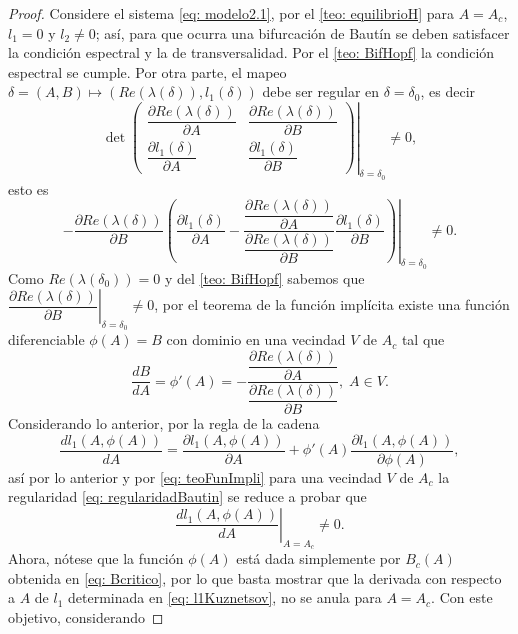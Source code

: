 \documentclass[]{article}
\theoremstyle{remark}
\begin{document}
	\begin{proof}
		Considere el sistema \eqref{eq: modelo2.1}, por el \autoref{teo: equilibrioH} para $A = A_c$, $l_1 = 0$ y $l_2 \neq 0$; así, para que ocurra una bifurcación de Bautín se deben satisfacer la condición espectral y la de transversalidad. Por el \autoref{teo: BifHopf} la condición espectral se cumple. Por otra parte, el mapeo $\delta = (A,B) \longmapsto \left(Re(\lambda(\delta)), l_1(\delta)\right)$ debe ser regular en $\delta=\delta_0$, es decir
		\begin{equation*}
			\det \left. \begin{pmatrix}
				\dfrac{\partial Re(\lambda(\delta))}{\partial A} & \dfrac{\partial Re(\lambda(\delta))}{\partial B} \\[6pt]
				\dfrac{\partial l_1(\delta)}{\partial A} & \dfrac{\partial l_1(\delta)}{\partial B} 
			\end{pmatrix} \right|_{\delta=\delta_0} \neq 0,
		\end{equation*}
		esto es
		\begin{equation}
			\left. - \dfrac{\partial Re(\lambda(\delta))}{\partial B} \left( \dfrac{\partial l_1(\delta)}{\partial A} - \dfrac{\dfrac{\partial Re(\lambda(\delta))}{\partial A}}{\dfrac{\partial Re(\lambda(\delta))}{\partial B}} \dfrac{\partial l_1(\delta)}{\partial B} \right) \right|_{\delta=\delta_0} \neq 0.
			\label{eq: regularidadBautin}
		\end{equation}
		Como $Re(\lambda(\delta_0))=0$ y del \autoref{teo: BifHopf} sabemos que  $\left. \dfrac{\partial Re(\lambda(\delta))}{\partial B} \right|_{\delta=\delta_0} \neq 0$, por el teorema de la función implícita existe una función diferenciable $\phi(A)=B$ con dominio en una vecindad $V$ de $A_c$ tal que
		\begin{equation}
			\dfrac{dB}{dA}=\phi'(A)= - \dfrac{\dfrac{\partial Re(\lambda(\delta))}{\partial A}}{\dfrac{\partial Re(\lambda(\delta))}{\partial B}}, \; A \in V.
			\label{eq: teoFunImpli}
		\end{equation}
		Considerando lo anterior, por la regla de la cadena $$\dfrac{d l_1(A, \phi(A))}{dA} = \dfrac{\partial l_1(A, \phi(A))}{\partial A} + \phi'(A) \dfrac{\partial l_1(A, \phi(A))}{\partial \phi(A)},$$ así por lo anterior y por \eqref{eq: teoFunImpli} para una vecindad $V$ de $A_c$ la regularidad \eqref{eq: regularidadBautin} se reduce a probar que $$\left. \dfrac{d l_1(A, \phi(A))}{dA} \right|_{A=A_c} \neq 0.$$ Ahora, nótese que la función $\phi(A)$ está dada simplemente por $B_c(A)$ obtenida en \eqref{eq: Bcritico}, por lo que basta mostrar que la derivada con respecto a $A$ de $l_1$ determinada en \eqref{eq: l1Kuznetsov}, no se anula para $A=A_c$. Con este objetivo, considerando

\end{proof}
\end{document}
